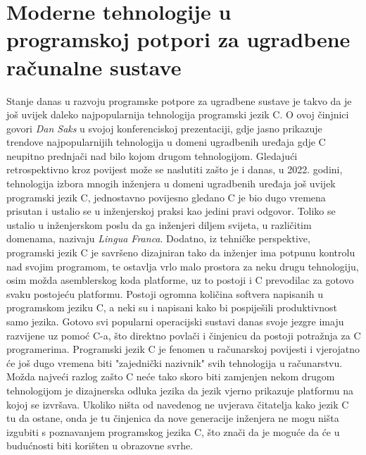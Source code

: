 \chapter{Moderne tehnologije u programskoj potpori za ugradbene računalne sustave}
Stanje danas u razvoju programske potpore za ugradbene sustave je takvo da je još uvijek daleko najpopularnija tehnologija programski jezik C. O ovoj činjnici govori \textit{Dan Saks} u svojoj konferenciskoj prezentaciji\cite{danSaksWritingBetterEmbeddedSoftware}, gdje jasno prikazuje trendove najpopularnijih tehnologija u domeni ugradbenih uređaja gdje C neupitno prednjači nad bilo kojom drugom tehnologijom. Gledajući retrospektivno kroz povijest može se naslutiti zašto je i danas, u 2022. godini, tehnologija izbora mnogih inženjera u domeni ugradbenih uređaja još uvijek programski jezik C, jednostavno povijesno gledano C je bio dugo vremena prisutan i ustalio se u inženjerskoj praksi kao jedini pravi odgovor. Toliko se ustalio u inženjerskom poslu da ga inženjeri diljem svijeta, u različitim domenama, nazivaju \textit{Lingua Franca}. Dodatno, iz tehničke perspektive, programski jezik C je savršeno dizajniran tako da inženjer ima potpunu kontrolu nad svojim programom, te ostavlja vrlo malo prostora za neku drugu tehnologiju, osim možda asemblerskog koda platforme, uz to postoji i C prevodilac za gotovo svaku postojeću platformu. Postoji ogromna količina softvera napisanih u programskom jeziku C, a neki su i napisani kako bi pospiješili produktivnost samo jezika. Gotovo svi popularni operacijski sustavi danas svoje jezgre imaju razvijene uz pomoć C-a, što direktno povlači i činjenicu da postoji potražnja za C programerima. Programski jezik C je fenomen u računarskoj povijesti i vjerojatno će još dugo vremena biti "zajednički nazivnik" svih tehnologija u računarstvu. Možda najveći razlog zašto C neće tako skoro biti zamjenjen nekom drugom tehnologijom je dizajnerska odluka jezika da jezik vjerno prikazuje platformu na kojoj se izvršava. Ukoliko ništa od navedenog ne uvjerava čitatelja kako jezik C tu da ostane, onda je tu činjenica da nove generacije inženjera ne mogu ništa izgubiti s poznavanjem programskog jezika C, što znači da je moguće da će u budućnosti biti korišten u obrazovne svrhe. \\
